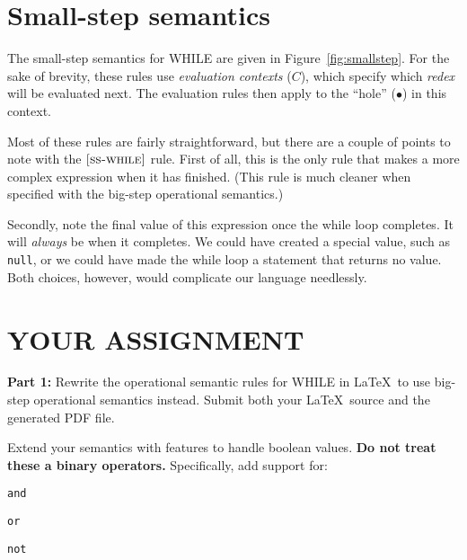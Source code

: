 \documentclass{article}
\newcommand{\rel}[1]{ \mbox{\sc [#1]} }
\begin{document}
\section{Small-step semantics}

\newcommand{\ssrule}[3]{
  \rel{#1} &
  \frac{\strut\begin{array}{@{}c@{}} #2 \end{array}}
       {\strut\begin{array}{@{}c@{}} #3 \end{array}}
   \\~\\
}
\newcommand{\sstep}[4]{\ctxt[{#1}],{#2} \rightarrow \ctxt[{#3}],{#4}}
\newcommand{\sstepraw}[4]{{#1},{#2} \rightarrow {#3},{#4}}
\newcommand{\ctxt}{C}

The small-step semantics for WHILE are given in Figure~\ref{fig:smallstep}.
For the sake of brevity, these rules use \emph{evaluation contexts} ($\ctxt$),
which specify which \emph{redex} will be evaluated next.
The evaluation rules then apply to the ``hole'' ($\bullet$) in this context.

Most of these rules are fairly straightforward, but there are a couple of points
to note with the $\rel{ss-while}$ rule.
First of all, this is the only rule that makes a more complex expression
when it has finished.
(This rule is much cleaner when specified with the big-step operational semantics.)

Secondly, note the final value of this expression once the while loop completes.
It will \emph{always} be {\false} when it completes.
We could have created a special value, such as {\tt null},
or we could have made the while loop a statement that returns no value.
Both choices, however, would complicate our language needlessly.


\section{YOUR ASSIGNMENT}
\newcommand{\bstep}[4]{{#1},{#2} \Downarrow {#3},{#4}}

\noindent
{\bf Part 1:}
Rewrite the operational semantic rules for WHILE in \LaTeX\
to use big-step operational semantics instead.
Submit both your \LaTeX\ source and the generated PDF file.

Extend your semantics with features to handle boolean values.
{\bf Do not treat these a binary operators.}
Specifically, add support for:
\begin{compactitem}
  \item {\tt and}
  \item {\tt or}
  \item {\tt not}
\end{compactitem}
\end{document}
